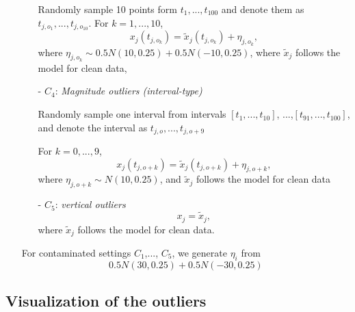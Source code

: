 \documentclass{article}
\begin{document}
\begin{itemize}
\begin{itemize}
       \vspace{1ex}
   Randomly sample 10  points form $t_1,..., t_{100}$ and denote them as $t_{j,o_1},..., t_{j,o_{10}}$. For $k = 1,..., 10$,   
    $$x_{j}(t_{j,o_k}) = \tilde{x}_j(t_{j,o_k}) + \eta_{j,o_k},$$ where $\eta_{j,o_k} \sim 0.5 N(10, 0.25) + 0.5 N(-10, 0.25)$, where
 $\tilde{x}_j$ follows the model for clean data,
    \vspace{1ex}
    \item[- ] $C_4$: \textit{Magnitude outliers (interval-type)}

    
       \vspace{1ex}
     Randomly sample one interval from intervals $[t_1,...,t_{10}]$, ...,$[t_{91},...,t_{100}]$,   and denote the interval as $t_{j,o},..., t_{j,o+9}$
     
     For $k = 0,..., 9$,   
    $$x_{j}(t_{j,o + k}) = \tilde{x}_j(t_{j,o + k}) + \eta_{j,o+k},$$ where $\eta_{j,o + k} \sim  N(10, 0.25)$, and 
 $\tilde{x}_j$ follows the model for clean data
    \vspace{1ex}
 
    \item[- ] $C_5$: \textit{vertical outliers} 
       \vspace{1ex}
   $$ x_j = \tilde{x}_j,$$
   where $\tilde{x}_j$ follows the model for clean data. 
\end{itemize}
For contaminated settings $C_1$,..., $C_5$, we generate $\eta_i$ from $$ 0.5N(30,0.25) + 0.5N(-30,0.25)$$
\end{itemize}




\subsection{Visualization of the outliers}
\end{document}
